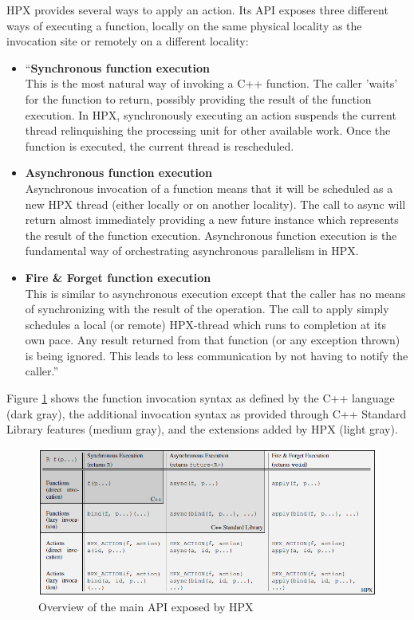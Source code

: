HPX provides several ways to apply an action. Its API exposes three different ways of executing a function, locally on the same physical locality as the invocation site or remotely on a different locality:

\begin{itemize}
\item ``\textbf{Synchronous function execution}\\
  This is the most natural way of invoking a C++ function. The caller ’waits’ for the function to return, possibly providing the result of the function execution. In HPX, synchronously executing an action suspends the current thread relinquishing the processing unit for other available work. Once the function is executed, the current thread is rescheduled.

\item \textbf{Asynchronous function execution}\\
  Asynchronous invocation of a function means that it will be scheduled as a new HPX thread (either locally or on another locality). The call to async will return almost immediately providing a new future instance which represents the result of the function execution. Asynchronous function execution is the fundamental way of orchestrating asynchronous parallelism in HPX.

\item \textbf{Fire \& Forget function execution}\\
  This is similar to asynchronous execution except that the caller has no means of synchronizing with the result of the operation. The call to apply simply schedules a local (or remote) HPX-thread which runs to completion at its own pace. Any result returned from that function (or any exception thrown) is being ignored. This leads to less communication by not having to notify the caller.''\cite{kaiser2014hpx}
\end{itemize}

Figure \ref{fig:hpx-api} shows the function invocation syntax as defined by the C++ language (dark gray), the additional invocation syntax as provided through C++ Standard Library features (medium gray), and the extensions added by HPX (light gray)\cite{kaiser2014hpx}.


\begin{figure}[h!]
\centering
\includegraphics[scale=0.72]{images/hpx_the_api.png}
\caption[Overview of the main API exposed by HPX]{Overview of the main API exposed by HPX~\cite{kaiser2014hpx}}
\label{fig:hpx-api}
\end{figure}

